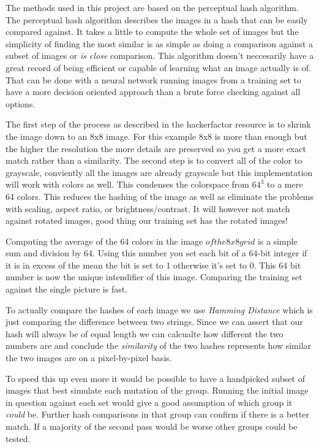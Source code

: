 \documentclass[letter,12pt]{article}
\begin{document}
\pagestyle{headings}

The methods used in this project are based on the perceptual hash algorithm. The perceptual hash algorithm describes the
images in a hash that can be easily compared against. It takes a little to compute the whole set of images but the simplicity
of finding the most similar is as simple as doing a comparison against a subset of images or \textit{is close} comparison. This algorithm
doesn't neccesarily have a great record of being efficient or capable of learning what an image actually is of. That can be
done with a neural network running images from a training set to have a more decision oriented approach than a brute force checking
against all options.

The first step of the process as described in the hackerfactor resource is to shrink the image down to an 8x8 image. For
this example 8x8 is more than enough but the higher the resolution the more details are preserved so you get a more exact
match rather than a similarity. The second step is to convert all of the color to grayscale, conviently all the images are
already grayscale but this implementation will work with colors as well. This condenses the colorspace from $ 64^3 $ to
a mere 64 colors. This reduces the hashing of the image as well as eliminate the problems with scaling, aspect ratio, or
brightness/contrast. It will however not match against rotated images, good thing our training set has the rotated images!

Computing the average of the 64 colors in the image \(of the 8x8 grid\) is a simple sum and division by 64. Using this number
you set each bit of a 64-bit integer if it is in excess of the mean the bit is set to 1 otherwise it's set to 0. This 64 bit
number is now the unique intendifier of this image. Comparing the training set against the single picture is fast.

To actually compare the hashes of each image we use \textit{Hamming Distance} which is just comparing the difference between
two strings. Since we can assert that our hash will always be of equal length we can calcualte how different the two numbers
are and conclude the \textit{similarity} of the two hashes represents how similar the two images are on a pixel-by-pixel basis.

To speed this up even more it would be possible to have a handpicked subset of images that best simulate each mutation of the
group. Running the initial image in question against each set would give a good assumption of which group it \textit{could} be.
Further hash comparisons in that group can confirm if there is a better match. If a majority of the second pass would be worse
other groups could be tested.
\end{document}
